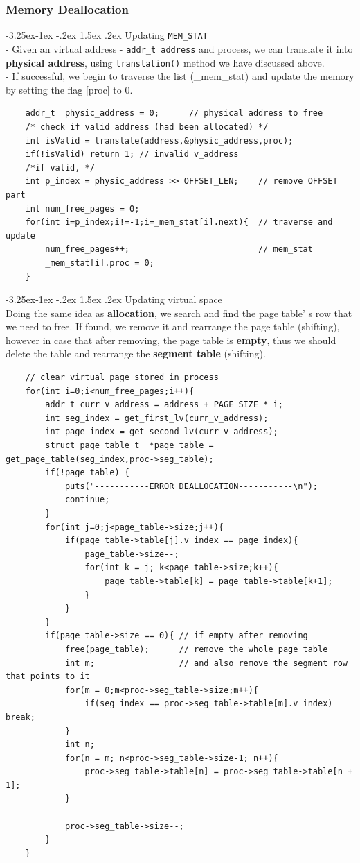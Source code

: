 \documentclass[a4paper]{article}
\makeatletter
\newcounter {subsubsubsection}[subsubsection]
\newcommand\subsubsubsection{\@startsection{subsubsubsection}{4}{\z@}%
                                     {-3.25ex\@plus -1ex \@minus -.2ex}%
                                     {1.5ex \@plus .2ex}%
                                     {\normalfont\normalsize\bfseries}}
\makeatother
\begin{document}
	\subsubsection{Memory Deallocation}
	\subsubsubsection{Updating \texttt{MEM\_STAT}}
	\hfill\\
	- Given an virtual address - \texttt{addr\_t address} and process, we can translate it into \textbf{physical address}, using \texttt{translation()} method we have discussed above. \\
	- If successful, we begin to traverse the list (\_mem\_stat) and update the memory by setting the flag [proc] to 0. \\
	\begin{lstlisting}
	addr_t 	physic_address = 0;      // physical address to free 
	/* check if valid address (had been allocated) */
	int isValid = translate(address,&physic_address,proc);
	if(!isValid) return 1; // invalid v_address
	/*if valid, */
	int p_index = physic_address >> OFFSET_LEN;    // remove OFFSET part
	int num_free_pages = 0;
	for(int i=p_index;i!=-1;i=_mem_stat[i].next){  // traverse and update  
	    num_free_pages++;                          // mem_stat
		_mem_stat[i].proc = 0;
	}
	\end{lstlisting}
	\subsubsubsection{Updating virtual space}
	\hfill \\
	Doing the same idea as \textbf{allocation}, we search and find the page table' s row that we need to free. If found, we remove it and rearrange the page table (shifting), however in case that after removing, the page table is \textbf{empty}, thus we should delete the table and rearrange the \textbf{segment table} (shifting).\\
	\begin{lstlisting}
	// clear virtual page stored in process
	for(int i=0;i<num_free_pages;i++){
		addr_t curr_v_address = address + PAGE_SIZE * i;
		int seg_index = get_first_lv(curr_v_address);
		int page_index = get_second_lv(curr_v_address);
		struct page_table_t  *page_table = get_page_table(seg_index,proc->seg_table);
		if(!page_table) {
			puts("-----------ERROR DEALLOCATION-----------\n");
			continue;
		}
		for(int j=0;j<page_table->size;j++){
			if(page_table->table[j].v_index == page_index){
				page_table->size--;
				for(int k = j; k<page_table->size;k++){
					page_table->table[k] = page_table->table[k+1]; 
				}                                                  
			}
		}
		if(page_table->size == 0){ // if empty after removing
			free(page_table);      // remove the whole page table 
			int m;                 // and also remove the segment row that points to it
			for(m = 0;m<proc->seg_table->size;m++){
				if(seg_index == proc->seg_table->table[m].v_index) break;
			}
			int n;
			for(n = m; n<proc->seg_table->size-1; n++){
				proc->seg_table->table[n] = proc->seg_table->table[n + 1];
			}
			
			proc->seg_table->size--;
		}
	}
	\end{lstlisting}
\end{document}
